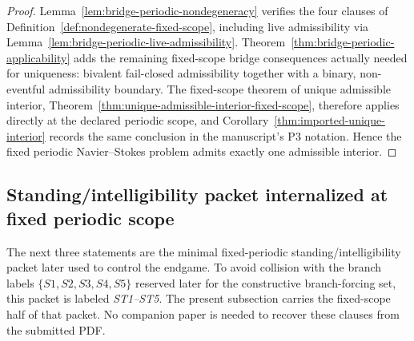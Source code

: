 \begin{proof}
Lemma~\ref{lem:bridge-periodic-nondegeneracy} verifies the four clauses of Definition~\ref{def:nondegenerate-fixed-scope}, including live admissibility via Lemma~\ref{lem:bridge-periodic-live-admissibility}. Theorem~\ref{thm:bridge-periodic-applicability} adds the remaining fixed-scope bridge consequences actually needed for uniqueness: bivalent fail-closed admissibility together with a binary, non-eventful admissibility boundary. The fixed-scope theorem of unique admissible interior, Theorem~\ref{thm:unique-admissible-interior-fixed-scope}, therefore applies directly at the declared periodic scope, and Corollary~\ref{thm:imported-unique-interior} records the same conclusion in the manuscript's P3 notation. Hence the fixed periodic Navier--Stokes problem admits exactly one admissible interior.
\end{proof}


\subsection{Standing/intelligibility packet internalized at fixed periodic scope}
\label{subsec:standing-intelligibility-packet}
The next three statements are the minimal fixed-periodic standing/intelligibility packet later used to control the endgame. To avoid collision with the branch labels $\{S1,S2,S3,S4,S5\}$ reserved later for the constructive branch-forcing set, this packet is labeled \emph{ST1--ST5}. The present subsection carries the fixed-scope half of that packet. No companion paper is needed to recover these clauses from the submitted PDF.

